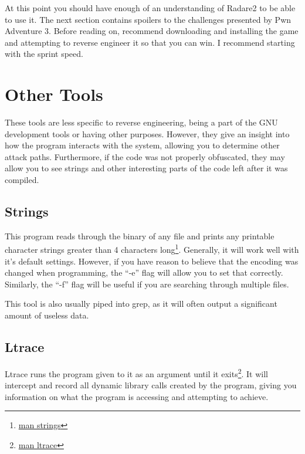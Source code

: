 			At this point you should have enough of an understanding of Radare2 to be able to use it. 
			The next section contains spoilers to the challenges presented by Pwn Adventure 3. 
			Before reading on, recommend downloading and installing the game and attempting to reverse engineer it so that you can win. 
			I recommend starting with the sprint speed. 
	\section{Other Tools}
		These tools are less specific to reverse engineering, being a part of the GNU development tools or having other purposes. 
		However, they give an insight into how the program interacts with the system, allowing you to determine other attack paths. 
		Furthermore, if the code was not properly obfuscated, they may allow you to see strings and other interesting parts of the code left after it was compiled. 
		\subsection{Strings}
			This program reads through the binary of any file and prints any printable character strings greater than 4 characters long\footnote{\href{http://linuxcommand.org/man\_pages/strings1.html}{man strings}}.
			Generally, it will work well with it's default settings. 
			However, if you have reason to believe that the encoding was changed when programming, the ``-e'' flag will allow you to set that correctly. 
			Similarly, the ``-f'' flag will be useful if you are searching through multiple files. 

			This tool is also usually piped into grep, as it will often output a significant amount of useless data. 
		\subsection{Ltrace}
			Ltrace runs the program given to it as an argument until it exits\footnote{\href{http://linuxcommand.org/man\_pages/ltrace1.html}{man ltrace}}.
			It will intercept and record all dynamic library calls created by the program, giving you information on what the program is accessing and attempting to achieve. 
		
